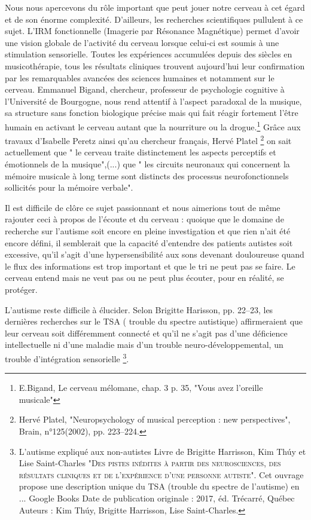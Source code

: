 Nous nous apercevons du rôle important que peut jouer notre cerveau à cet égard et de son énorme complexité. 
D'ailleurs, les recherches scientifiques pullulent à ce sujet. L'IRM fonctionnelle (Imagerie par Résonance Magnétique)  permet d'avoir une vision globale de l'activité du cerveau lorsque celui-ci est soumis à une stimulation sensorielle. Toutes les expériences accumulées depuis des siècles en musicothérapie, tous les résultats cliniques trouvent aujourd'hui leur confirmation par les remarquables avancées des sciences humaines et notamment sur le cerveau. Emmanuel Bigand,  chercheur, professeur de psychologie cognitive à l'Université de Bourgogne, nous rend attentif à  l'aspect paradoxal de la musique, sa structure sans fonction biologique précise mais qui fait réagir fortement l'être humain en activant  le cerveau autant que la nourriture ou la drogue.\footnote{E.Bigand, Le cerveau mélomane, chap. 3 p. 35, "Vous avez l'oreille musicale"}  Grâce aux travaux d'Isabelle Peretz%
\autocite[<<\,Les agnosies auditives\,>>, pp. 205--216]{seron.baron.ea:neuropsychologie}
ainsi qu'au chercheur français, Hervé Platel%
\footnote{Hervé Platel, "Neuropsychology of musical perception : new perspectives", Brain, n°125(2002), pp. 223--224.} on sait actuellement que " le cerveau traite distinctement les aspects perceptifs et émotionnels de la musique",(...) que " les circuits neuronaux qui concernent la mémoire musicale à long terme sont distincts des processus neurofonctionnels sollicités pour la mémoire verbale".

Il est difficile de clôre ce sujet passionnant et nous aimerions tout de même rajouter ceci à propos de l'écoute et du cerveau : quoique que le domaine de recherche sur l'autisme soit encore en pleine investigation et que rien n'ait été encore défini, il semblerait que la capacité d'entendre des patients autistes soit excessive, qu'il s'agit d'une hypersensibilité aux sons devenant douloureuse quand  le flux des informations est trop important et que le tri ne peut pas se faire. Le cerveau entend mais ne veut pas ou ne peut plus  écouter, pour en réalité, se protéger.

 L'autisme reste difficile à élucider. Selon Brigitte Harisson, pp. 22--23, les dernières recherches sur le TSA ( trouble du spectre autistique) affirmeraient que leur cerveau soit différemment connecté et qu'il ne s'agit pas d'une déficience intellectuelle ni d'une maladie mais d'un trouble neuro-développemental, un trouble d'intégration sensorielle%
\footnote{L'autisme expliqué aux non-autistes
Livre de Brigitte Harrisson, Kim Thúy et Lise Saint-Charles
\textsc{"Des pistes inédites à partir des neurosciences, des résultats cliniques et de l'expérience d'une personne autiste".} Cet ouvrage propose une description unique du TSA (trouble du spectre de l'autisme) en ... Google Books
Date de publication originale : 2017, éd. Trécarré, Québec
Auteurs : Kim Thúy, Brigitte Harrisson, Lise Saint-Charles.}.





